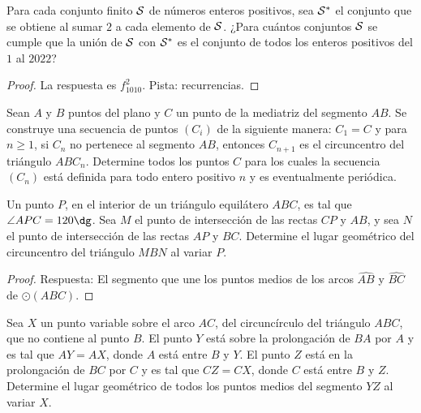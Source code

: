 \begin{probEB}
	Para cada conjunto finito $\cal S$ de números enteros positivos, sea $\cal S^\ast$ el conjunto que se obtiene al sumar $2$ a cada elemento de $\cal S$. ¿Para cuántos conjuntos $\cal S$ se cumple que la unión de $\cal S$ con $\cal S^\ast$ es el conjunto de todos los enteros positivos del $1$ al $2022$?
\end{probEB}

\begin{proof}
	La respuesta es $f_{1010}^2$. Pista: recurrencias.
\end{proof}


\begin{probEG}[IberoAmerican 1999/6]
	Sean $A$ y $B$ puntos del plano y $C$ un punto de la mediatriz del segmento $AB$. Se construye una secuencia de puntos $(C_i)$ de la siguiente manera: $C_1=C$ y para $n\ge 1$, si $C_n$ no pertenece al segmento $AB$, entonces $C_{n+1}$ es el circuncentro del triángulo $ABC_n$. Determine todos los puntos $C$ para los cuales la secuencia $(C_n)$ está definida para todo entero positivo $n$ y es eventualmente periódica.
\end{probEG}

\begin{probEG}[IberoAmerican 2002/3]
	Un punto $P$, en el interior de un triángulo equilátero $ABC$, es tal que $\angle APC=120\dg$. Sea $M$ el punto de intersección de las rectas $CP$ y $AB$, y sea $N$ el punto de intersección de las rectas $AP$ y $BC$. Determine el lugar geométrico del circuncentro del triángulo $MBN$ al variar $P$.
\end{probEG}

\begin{proof}
	Respuesta: El segmento que une los puntos medios de los arcos $\widehat{AB}$ y $\widehat{BC}$ de $\odot(ABC)$.
\end{proof}

\begin{probMB}
	Sea $X$ un punto variable sobre el arco $AC$, del circuncírculo del triángulo $ABC$, que no contiene al punto $B$. El punto $Y$ está sobre la prolongación de $BA$ por $A$ y es tal que $AY=AX$, donde $A$ está entre $B$ y $Y$. El punto $Z$ está en la prolongación de $BC$ por $C$ y es tal que $CZ=CX$, donde $C$ está entre $B$ y $Z$. Determine el lugar geométrico de todos los puntos medios del segmento $YZ$ al variar $X$.
\end{probMB}

